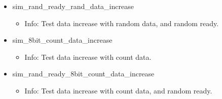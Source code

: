 \begin{itemize}
\begin{itemize}
	\item[$\space$] Info: Test data increase with random data.
	\end{itemize}
\item sim\_rand\_ready\_rand\_data\_increase
	\begin{itemize}
	\item[$\space$] Info: Test data increase with random data, and random ready.
	\end{itemize}
\item sim\_8bit\_count\_data\_increase
	\begin{itemize}
	\item[$\space$] Info: Test data increase with count data.
	\end{itemize}
\item sim\_rand\_ready\_8bit\_count\_data\_increase
	\begin{itemize}
	\item[$\space$] Info: Test data increase with count data, and random ready.
	\end{itemize}
\end{itemize}
